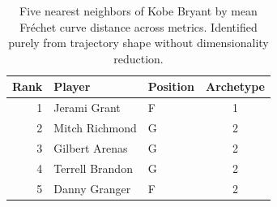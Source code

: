 \begin{table}[htbp]
  \centering\small
  \begin{tabular}{rllc}
    \toprule
    Rank & Player & Position & Archetype \\
    \midrule
    1 & Jerami Grant & F & 1 \\
    2 & Mitch Richmond & G & 2 \\
    3 & Gilbert Arenas & G & 2 \\
    4 & Terrell Brandon & G & 2 \\
    5 & Danny Granger & F & 2 \\
    \bottomrule
  \end{tabular}
  \caption{Five nearest neighbors of Kobe Bryant by mean Fr\'{e}chet curve distance across metrics. Identified purely from trajectory shape without dimensionality reduction.}
  \label{tab:Kobe_Bryant_frechet_curve_neighbors}
\end{table}

